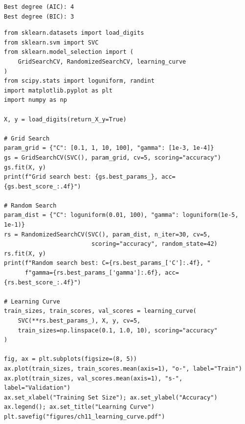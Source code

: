 \begin{codeoutput}
\begin{verbatim}
Best degree (AIC): 4
Best degree (BIC): 3
\end{verbatim}
\end{codeoutput}

\begin{codeblock}[title=\textbf{Grid Search, Random Search, and Learning Curves}]
\begin{verbatim}
from sklearn.datasets import load_digits
from sklearn.svm import SVC
from sklearn.model_selection import (
    GridSearchCV, RandomizedSearchCV, learning_curve
)
from scipy.stats import loguniform, randint
import matplotlib.pyplot as plt
import numpy as np

X, y = load_digits(return_X_y=True)

# Grid Search
param_grid = {"C": [0.1, 1, 10, 100], "gamma": [1e-3, 1e-4]}
gs = GridSearchCV(SVC(), param_grid, cv=5, scoring="accuracy")
gs.fit(X, y)
print(f"Grid search best: {gs.best_params_}, acc={gs.best_score_:.4f}")

# Random Search
param_dist = {"C": loguniform(0.01, 100), "gamma": loguniform(1e-5, 1e-1)}
rs = RandomizedSearchCV(SVC(), param_dist, n_iter=30, cv=5,
                         scoring="accuracy", random_state=42)
rs.fit(X, y)
print(f"Random search best: C={rs.best_params_['C']:.4f}, "
      f"gamma={rs.best_params_['gamma']:.6f}, acc={rs.best_score_:.4f}")

# Learning Curve
train_sizes, train_scores, val_scores = learning_curve(
    SVC(**rs.best_params_), X, y, cv=5,
    train_sizes=np.linspace(0.1, 1.0, 10), scoring="accuracy"
)

fig, ax = plt.subplots(figsize=(8, 5))
ax.plot(train_sizes, train_scores.mean(axis=1), "o-", label="Train")
ax.plot(train_sizes, val_scores.mean(axis=1), "s-", label="Validation")
ax.set_xlabel("Training Set Size"); ax.set_ylabel("Accuracy")
ax.legend(); ax.set_title("Learning Curve")
plt.savefig("figures/ch11_learning_curve.pdf")
\end{verbatim}
\end{codeblock}

